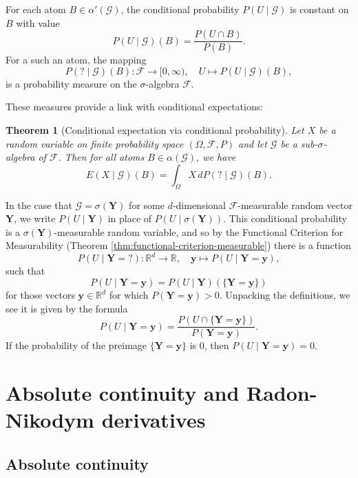 \documentclass[11pt]{book}
\newtheorem{thm}{Theorem}[section]
\theoremstyle{definition}
\numberwithin{equation}{section}
\begin{document}
For each atom $B\in \alpha'(\mathcal{G})$, the conditional probability $P(U\mid \mathcal{G})$ is constant on $B$ with value
\[
	P(U\mid \mathcal{G})(B) = \frac{P(U\cap B)}{P(B)}.
\]
For a such an atom, the mapping
\[
	P({?}\mid \mathcal{G})(B): \mathcal{F} \to [0, \infty), \quad U \mapsto P(U\mid \mathcal{G})(B),
\]
is a probability measure on the $\sigma$-algebra $\mathcal{F}$.

These measures provide a link with conditional expectations:

\begin{thm}[Conditional expectation via conditional probability]\label{thm:cond-exp-familiar}
	Let $X$ be a random variable on finite probability space $(\Omega, \mathcal{F}, P)$ and let $\mathcal{G}$ be a sub-$\sigma$-algebra of $\mathcal{F}$. Then for all atoms $B\in \alpha(\mathcal{G})$, we have
	\[
		E(X \mid \mathcal{G})(B) = \int_\Omega X \, dP({?} \mid \mathcal{G})(B).
	\]
\end{thm}

In the case that $\mathcal{G} = \sigma(\mathbf{Y})$ for some $d$-dimensional $\mathcal{F}$-measurable random vector $\mathbf{Y}$, we write $P(U \mid \mathbf{Y})$ in place of $P(U \mid \sigma(\mathbf{Y}))$. This conditional probability is a $\sigma(\mathbf{Y})$-measurable random variable, and so by the Functional Criterion for Measurability (Theorem \ref{thm:functional-criterion-measurable}) there is a function
\[
	P(U \mid \mathbf{Y} = {?}): \mathbb{R}^d \to \mathbb{R}, \quad \mathbf{y} \mapsto P(U \mid \mathbf{Y} = \mathbf{y}),
\]
such that
\[
	P(U \mid \mathbf{Y} = \mathbf{y}) = P(U \mid \mathbf{Y})(\{\mathbf{Y} = \mathbf{y}\})
\]
for those vectors $\mathbf{y}\in \mathbb{R}^d$ for which $P(\mathbf{Y} = \mathbf{y})>0$. Unpacking the definitions, we see it is given by the formula
\[
	P(U \mid \mathbf{Y} = \mathbf{y}) = \frac{P\left(U \cap \{\mathbf{Y} = \mathbf{y}\} \right)}{P(\mathbf{Y} = \mathbf{y})}.
\]
If the probability of the preimage $\{\mathbf{Y}=\mathbf{y}\}$ is $0$, then $P(U \mid \mathbf{Y} = \mathbf{y})=0$.

\section{Absolute continuity and Radon-Nikodym derivatives}

\subsection{Absolute continuity}
\end{document}
